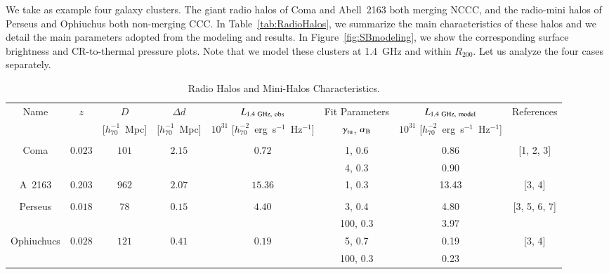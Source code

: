 \documentclass[traditabstract]{aa}
\begin{document}
We take as example four galaxy clusters. The giant radio halos of Coma \citep{1997A&A...321...55D} and Abell~2163 \citep{2001A&A...373..106F,2009A&A...499..679M} both merging NCCC, and the radio-mini halos of Perseus \citep{1990MNRAS.246..477P} and Ophiuchus \citep{2009A&A...499..371G,2009A&A...499..679M} both non-merging CCC. In Table~\ref{tab:RadioHalos}, we summarize the main characteristics of these halos and we detail the main parameters adopted from the modeling and results. In Figure~\ref{fig:SBmodeling}, we show the corresponding surface brightness and CR-to-thermal pressure plots. Note that we model these clusters at 1.4~GHz and within $R_{200}$. 
Let us analyze the four cases separately. 

\begin{table}[hbt!]
\begin{center}
\caption{Radio Halos and Mini-Halos Characteristics.}
\medskip
\begin{tabular}{cccccccc}
\hline
\phantom{\Big|}
Name & $z$ & $D$ & $\Delta d$ & $L_{1.4~\rm{GHz},~\rm{obs}}$ & Fit Parameters & $L_{1.4~\rm{GHz},~\rm{model}}$ & References \\
\phantom{\Big|}
           &   & [$h_{70}^{-1}$~Mpc] & [$h_{70}^{-1}$~Mpc] & $10^{31}$ [$h_{70}^{-2}$~erg~s$^{-1}$~Hz$^{-1}$] & $\gamma_{\rm{tu}}$, $\alpha_{\rm{B}}$ & $10^{31}$ [$h_{70}^{-2}$~erg~s$^{-1}$~Hz$^{-1}$] & \\
\hline \\[-0.5em]
Coma           & $0.023$ & $101$ & $2.15$ & $0.72$  & 1, 0.6  & 0.86 &  [1, 2, 3]   \\
               &         &       &        &                        & 4, 0.3  & 0.90  &  \\
A~2163         & $0.203$ & $962$ & $2.07$ & $15.36$     & 1, 0.3  & 13.43  &  [3, 4]  \\
\hline \\[-0.5em]
Perseus        & $0.018$ & $78$   & $0.15$ & $4.40$ & 3, 0.4   & 4.80 &  [3, 5, 6, 7]  \\
               &         &        &        &                       & 100, 0.3 & 3.97 &  \\
Ophiuchucs     & $0.028$ & $121$  & $0.41$ & $0.19$       & 5, 0.7   & 0.19  &  [3, 4] \\
               &         &        &        &                       & 100, 0.3 & 0.23 &   \\[0.5em]
\hline
\end{tabular}

\end{center}
\end{table}
\end{document}
